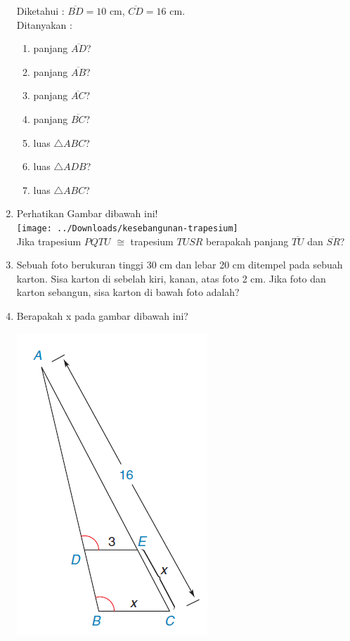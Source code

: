 \documentclass[12pt,a4paper]{exam}
\begin{document}
\begin{enumerate}
			Diketahui : $\overline{BD}=10$ cm, $\overline{CD}=16$ cm.
			\\
			Ditanyakan :
				\begin{enumerate}
					\item panjang $\overline{AD}$?
					\item panjang $\overline{AB}$?
					\item panjang $\overline{AC}$?
					\item panjang $\overline{BC}$?
					\item luas $\triangle{ABC}$?
					\item luas $\triangle{ADB}$?
					\item luas $\triangle{ABC}$?
				\end{enumerate}
				\item Perhatikan Gambar dibawah ini!\\
				\texttt{[image: ../Downloads/kesebangunan-trapesium]}\\
				Jika trapesium $PQTU$ $\cong$ trapesium $TUSR$ berapakah panjang $\overline{TU}$ dan $\overline{SR}$?
				\item Sebuah foto berukuran tinggi 30 cm dan lebar 20 cm ditempel pada sebuah karton. Sisa karton di sebelah kiri, kanan, atas foto 2 cm. Jika foto dan karton sebangun, sisa karton di bawah foto adalah?
				\item Berapakah x pada gambar dibawah ini?
				\begin{center}
				\includegraphics[scale=0.4]{screenshot004}\end{center}
			

\end{enumerate}
\end{document}
